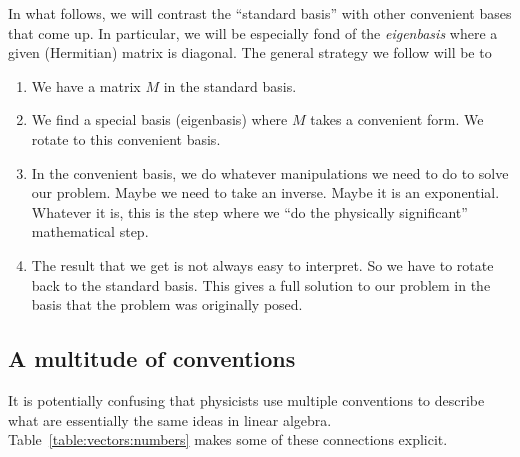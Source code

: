 \documentclass[12pt]{article}
\begin{document}
In what follows, we will contrast the ``standard basis'' with other convenient bases that come up. In particular, we will be especially fond of the \emph{eigenbasis} where a given (Hermitian) matrix is diagonal. The general strategy we follow will be to 
\begin{enumerate}
    \item We have a matrix $M$ in the standard basis. 
    \item We find a special basis (eigenbasis) where $M$ takes a convenient form. We rotate to this convenient basis.
    \item In the convenient basis, we do whatever manipulations we need to do to solve our problem. Maybe we need to take an inverse. Maybe it is an exponential. Whatever it is, this is the step where we ``do the physically significant'' mathematical step.
    \item The result that we get is not always easy to interpret. So we have to rotate back to the standard basis. This gives a full solution to our problem in the basis that the problem was originally posed.
\end{enumerate}






\subsection{A multitude of conventions}

It is potentially confusing that physicists use multiple conventions to describe what are essentially the same ideas in linear algebra. Table~\ref{table:vectors:numbers} makes some of these connections explicit.
\end{document}
